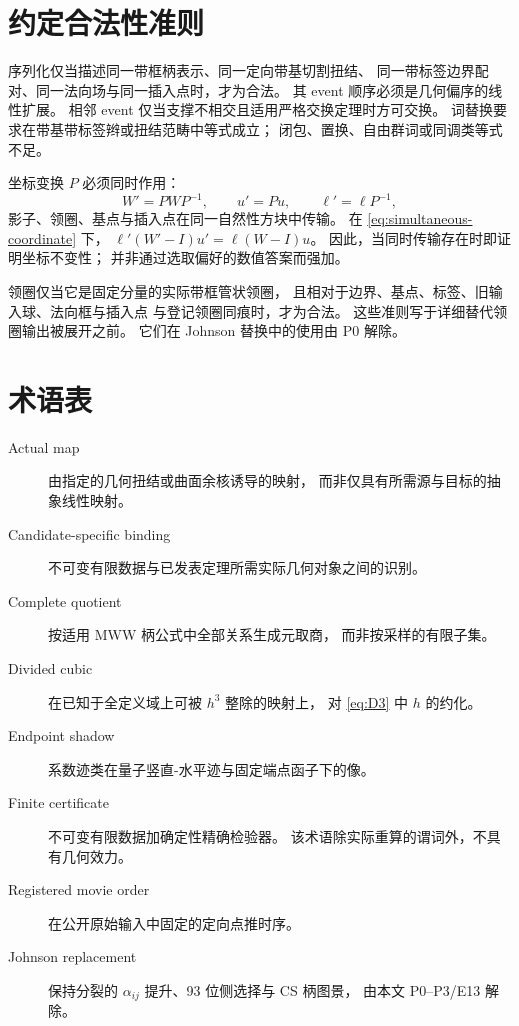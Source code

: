 \section{约定合法性准则}\label{app:legality}

序列化仅当描述同一带框柄表示、同一定向带基切割扭结、
同一带标签边界配对、同一法向场与同一插入点时，才为合法。
其 event 顺序必须是几何偏序的线性扩展。
相邻 event 仅当支撑不相交且适用严格交换定理时方可交换。
词替换要求在带基带标签辫或扭结范畴中等式成立；
闭包、置换、自由群词或同调类等式不足。

坐标变换 $P$ 必须同时作用：
\begin{equation}\label{eq:simultaneous-coordinate}
W'=PWP^{-1},\qquad u'=Pu,\qquad
\ell'=\ell P^{-1},
\end{equation}
影子、领圈、基点与插入点在同一自然性方块中传输。
在 \eqref{eq:simultaneous-coordinate} 下，
$\ell'(W'-I)u'=\ell(W-I)u$。
因此，当同时传输存在时即证明坐标不变性；
并非通过选取偏好的数值答案而强加。

领圈仅当它是固定分量的实际带框管状领圈，
且相对于边界、基点、标签、旧输入球、法向框与插入点
与登记领圈同痕时，才为合法。
这些准则写于详细替代领圈输出被展开之前。
它们在 Johnson 替换中的使用由 P0 解除。

\section{术语表}\label{app:glossary}

\begin{description}
\item[Actual map]
由指定的几何扭结或曲面余核诱导的映射，
而非仅具有所需源与目标的抽象线性映射。
\item[Candidate-specific binding]
不可变有限数据与已发表定理所需实际几何对象之间的识别。
\item[Complete quotient]
按适用 MWW 柄公式中全部关系生成元取商，
而非按采样的有限子集。
\item[Divided cubic]
在已知于全定义域上可被 $h^3$ 整除的映射上，
对 \eqref{eq:D3} 中 $h$ 的约化。
\item[Endpoint shadow]
系数迹类在量子竖直-水平迹与固定端点函子下的像。
\item[Finite certificate]
不可变有限数据加确定性精确检验器。
该术语除实际重算的谓词外，不具有几何效力。
\item[Registered movie order]
在公开原始输入中固定的定向点推时序。
\item[Johnson replacement]
保持分裂的 $\alpha_{ij}$ 提升、93 位侧选择与 CS 柄图景，
由本文 P0--P3/E13 解除。
\end{description}

